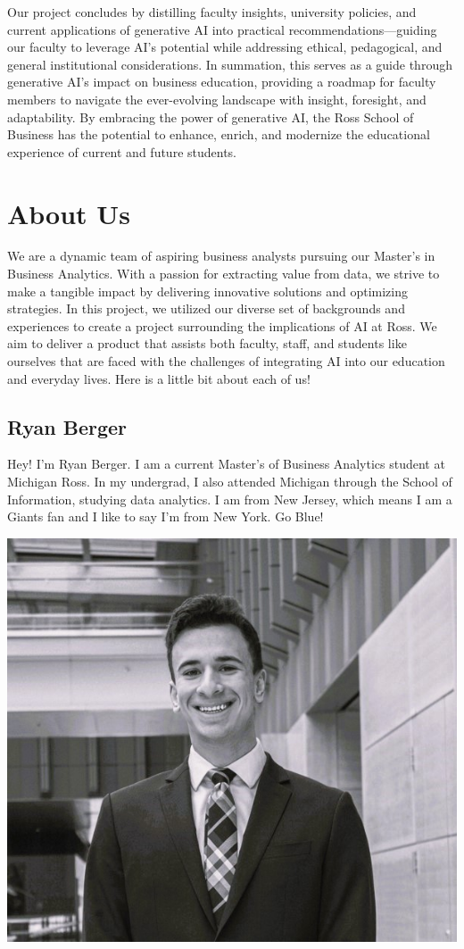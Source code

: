 \documentclass[
]{book}
\begin{document}
Our project concludes by distilling faculty insights, university policies, and current applications of generative AI into practical recommendations---guiding our faculty to leverage AI's potential while addressing ethical, pedagogical, and general institutional considerations. In summation, this serves as a guide through generative AI's impact on business education, providing a roadmap for faculty members to navigate the ever-evolving landscape with insight, foresight, and adaptability. By embracing the power of generative AI, the Ross School of Business has the potential to enhance, enrich, and modernize the educational experience of current and future students.

\hypertarget{about-us}{%
\chapter{About Us}\label{about-us}}

We are a dynamic team of aspiring business analysts pursuing our Master's in Business Analytics. With a passion for extracting value from data, we strive to make a tangible impact by delivering innovative solutions and optimizing strategies. In this project, we utilized our diverse set of backgrounds and experiences to create a project surrounding the implications of AI at Ross. We aim to deliver a product that assists both faculty, staff, and students like ourselves that are faced with the challenges of integrating AI into our education and everyday lives. Here is a little bit about each of us!

\hypertarget{ryan-berger}{%
\section{Ryan Berger}\label{ryan-berger}}

Hey! I'm Ryan Berger. I am a current Master's of Business Analytics student at Michigan Ross. In my undergrad, I also attended Michigan through the School of Information, studying data analytics. I am from New Jersey, which means I am a Giants fan and I like to say I'm from New York. Go Blue!

\includegraphics[width=0.4\linewidth]{rtberger}
\end{document}
